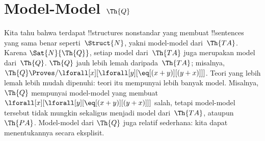 \documentclass[../../../include/open-logic-section]{subfiles}
\begin{document}
\section{Model-Model $\Th{Q}$}

\begin{explain}
Kita tahu bahwa terdapat !!{structure}s nonstandar yang membuat
!!{sentence}s yang sama benar seperti~$\Struct{N}$, yakni model-model
dari~$\Th{TA}$. Karena $\Sat{N}{\Th{Q}}$, setiap model dari~$\Th{TA}$ juga
merupakan model dari~$\Th{Q}$. $\Th{Q}$ jauh lebih lemah daripada~$\Th{TA}$;
misalnya,
$\Th{Q} \Proves/ \lforall[x][\lforall[y][\eq[(x + y)][(y+x)]]]$.
Teori yang lebih lemah lebih mudah dipenuhi: teori itu mempunyai lebih banyak
model. Misalnya, $\Th{Q}$ mempunyai model-model yang membuat
$\lforall[x][\lforall[y][\eq[(x + y)][(y+x)]]]$ salah, tetapi model-model
tersebut tidak mungkin sekaligus menjadi model dari~$\Th{TA}$, ataupun
$\Th{PA}$. Model-model dari $\Th{Q}$ juga relatif sederhana: kita dapat
menentukannya secara eksplisit.
\end{explain}
\end{document}
